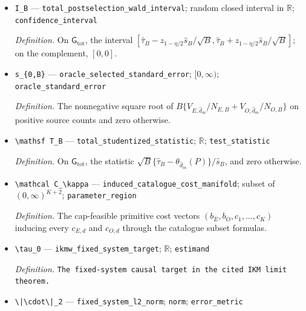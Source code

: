 \documentclass{article}
\begin{document}
\begin{itemize}
  \item \texttt{I\_\allowbreak{}B} --- \texttt{total\_\allowbreak{}postselection\_\allowbreak{}wald\_\allowbreak{}interval}; random closed interval in \(\mathbb R\); \texttt{confidence\_\allowbreak{}interval}
  \par\smallskip\noindent\emph{Definition.} On \(\mathsf G_{\mathrm{tot}}\), the interval \([\widehat\tau_B-z_{1-\eta/2}\widehat s_B/\sqrt B,\widehat\tau_B+z_{1-\eta/2}\widehat s_B/\sqrt B]\); on the complement, \([0,0]\).
  \item \texttt{s\_\allowbreak{}\{0,\allowbreak{}B\}\allowbreak{}} --- \texttt{oracle\_\allowbreak{}selected\_\allowbreak{}standard\_\allowbreak{}error}; \([0,\infty)\); \texttt{oracle\_\allowbreak{}standard\_\allowbreak{}error}
  \par\smallskip\noindent\emph{Definition.} The nonnegative square root of \(B\{V_{E,\widehat d_m}/N_{E,B}+V_{O,\widehat d_m}/N_{O,B}\}\) on positive source counts and zero otherwise.
  \item \texttt{\textbackslash{}\allowbreak{}mathsf T\_\allowbreak{}B} --- \texttt{total\_\allowbreak{}studentized\_\allowbreak{}statistic}; \(\mathbb R\); \texttt{test\_\allowbreak{}statistic}
  \par\smallskip\noindent\emph{Definition.} On \(\mathsf G_{\mathrm{tot}}\), the statistic \(\sqrt B\{\widehat\tau_B-\theta_{\widehat d_m}(P)\}/\widehat s_B\), and zero otherwise.
  \item \texttt{\textbackslash{}\allowbreak{}mathcal C\_\allowbreak{}\textbackslash{}\allowbreak{}kappa} --- \texttt{induced\_\allowbreak{}catalogue\_\allowbreak{}cost\_\allowbreak{}manifold}; subset of \((0,\infty)^{K+2}\); \texttt{parameter\_\allowbreak{}region}
  \par\smallskip\noindent\emph{Definition.} The cap-feasible primitive cost vectors \((b_E,b_O,c_1,\ldots,c_K)\) inducing every \(c_{E,d}\) and \(c_{O,d}\) through the catalogue subset formulas.
  \item \texttt{\textbackslash{}\allowbreak{}tau\_\allowbreak{}0} --- \texttt{ikmw\_\allowbreak{}fixed\_\allowbreak{}system\_\allowbreak{}target}; \(\mathbb R\); \texttt{estimand}
  \par\smallskip\noindent\emph{Definition.} \texttt{The fixed-\allowbreak{}system causal target in the cited IKM limit theorem.}
  \item \texttt{\textbackslash{}\allowbreak{}|\textbackslash{}\allowbreak{}cdot\textbackslash{}\allowbreak{}|\_\allowbreak{}2} --- \texttt{fixed\_\allowbreak{}system\_\allowbreak{}l2\_\allowbreak{}norm}; \texttt{norm}; \texttt{error\_\allowbreak{}metric}

\end{itemize}
\end{document}
